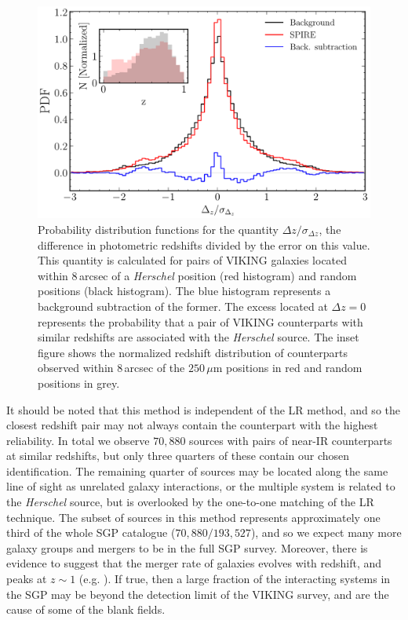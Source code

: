 \begin{figure}
    \centering
    \includegraphics[width=0.8\columnwidth]{Figures/delta_z_multiplicity.pdf}
    \caption[PDFs of $\Delta z/\sigma_{\Delta z}$ for \textit{Herschel} sources and random positions]{Probability distribution functions for the quantity $\Delta z/\sigma_{\Delta z}$, the difference in photometric redshifts divided by the error on this value. This quantity is calculated for pairs of VIKING galaxies located within $8\,$arcsec of a \textit{Herschel} position (red histogram) and random positions (black histogram). The blue histogram represents a background subtraction of the former. The excess located at $\Delta z = 0$ represents the probability that a pair of VIKING counterparts with similar redshifts are associated with the \textit{Herschel} source. The inset figure shows the normalized redshift distribution of counterparts observed within $8\,$arcsec of the $250\,\mu$m positions in red and random positions in grey.}
    \label{fig:delta_z_multiplicity}
\end{figure}

It should be noted that this method is independent of the LR method, and so the closest redshift pair may not always contain the counterpart with the highest reliability. In total we observe $70,880$ sources with pairs of near-IR counterparts at similar redshifts, but only three quarters of these contain our chosen identification. The remaining quarter of sources may be located along the same line of sight as unrelated galaxy interactions, or the multiple system is related to the \textit{Herschel} source, but is overlooked by the one-to-one matching of the LR technique. The subset of sources in this method represents approximately one third of the whole SGP catalogue ($70,880/193,527$), and so we expect many more galaxy groups and mergers to be in the full SGP survey. Moreover, there is evidence to suggest that the merger rate of galaxies evolves with redshift, and peaks at $z \sim 1$ (e.g. \citealt{Bell_2006, Ryan_2008}). If true, then a large fraction of the interacting systems in the SGP may be beyond the detection limit of the VIKING survey, and are the cause of some of the blank fields.

